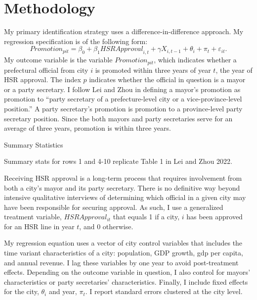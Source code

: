 \documentclass[12pt, ]{article}
\begin{document}
\hypertarget{methodology}{%
\section{Methodology}\label{methodology}}

My primary identification strategy uses a difference-in-difference
approach. My regression specification is of the following form:
\[Promotion_{pit} = \beta_{0} + \beta_{1}{HSR Approval}_{i,t} + \gamma X_{i,t - 1} + \theta_{i} + \pi_{t} + \varepsilon_{it}.\]
My outcome variable is the variable \(Promotion_{pit}\), which indicates
whether a prefectural official from city \(i\) is promoted within three
years of year \(t\), the year of HSR approval. The index \(p\) indicates
whether the official in question is a mayor or a party secretary. I
follow Lei and Zhou in defining a mayor's promotion as promotion to
``party secretary of a prefecture-level city or a vice-province-level
position.'' A party secretary's promotion is promotion to a
province-level party secretary position. Since the both mayors and party
secretaries serve for an average of three years, promotion is within
three years.

\begin{table}
  \caption{Summary Statistics}
  \label{Table1}
  
  \caption*{Summary stats for rows 1 and 4-10 replicate Table 1 in Lei and Zhou 2022.}
\end{table}

Receiving HSR approval is a long-term process that requires involvement
from both a city's mayor and its party secretary. There is no definitive
way beyond intensive qualitative interviews of determining which
official in a given city may have been responsible for securing
approval. As such, I use a generalized treatment variable,
\(HSR Approval_{it}\) that equals 1 if a city, \(i\) has been approved
for an HSR line in year \(t\), and 0 otherwise.

My regression equation uses a vector of city control variables that
includes the time variant characteristics of a city: population, GDP
growth, gdp per capita, and annual revenue. I lag these variables by one
year to avoid post-treatment effects. Depending on the outcome variable
in question, I also control for mayors' characteristics or party
secretaries' characteristics. Finally, I include fixed effects for the
city, \(\theta_{i}\) and year, \(\pi_{t}\). I report standard errors
clustered at the city level.
\end{document}
